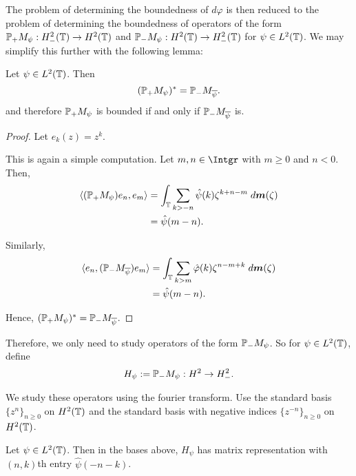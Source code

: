 \documentclass{unswmaths}
\begin{document}
The problem of determining the boundedness of $d\varphi$ is then reduced to the problem of determining
the boundedness of operators of the form $\mathbb{P}_+M_\psi:H^2_-(\mathbb{T})\rightarrow H^2(\mathbb{T})$ and $\mathbb{P}_-M_\psi:H^2(\mathbb{T})\rightarrow H^2_-(\mathbb{T})$ for $\psi \in L^2(\mathbb{T})$. We may simplify
this further with the following lemma:
\begin{lemma}
    Let $\psi \in L^2(\mathbb{T})$. Then
    \begin{equation*}
        (\mathbb{P}_+M_\psi)^* = \mathbb{P}_-M_{\overline{\psi}}.
    \end{equation*}
    and therefore $\mathbb{P}_+M_\psi$ is bounded if and only if $\mathbb{P}_-M_{\overline{\psi}}$ is.
\end{lemma}
\begin{proof}
    Let $e_k(z) = z^k$. 

    This is again a simple computation. Let $m,n\in \Intgr$ with $m \geq 0$ and $n < 0$. Then,
    \begin{align*}
        \langle (\mathbb{P}_+M_\psi)e_n,e_m\rangle &= \int_{\mathbb{T}}\sum_{k>-n} \hat{\psi}(k)\zeta^{k+n-m}\;d\boldsymbol{m}(\zeta)\\
        &= \hat{\psi}(m-n).
    \end{align*}
    
    Similarly,
    \begin{align*}
        \langle e_n, (\mathbb{P}_-M_{\overline{\psi}})e_m \rangle &= \int_{\mathbb{T}} \sum_{k > m} \hat{\varphi}(k) \zeta^{n-m+k}\;d\boldsymbol{m}(\zeta)\\
                                                &= \hat{\psi}(m-n).
    \end{align*}
    
    Hence, $(\mathbb{P}_+M_\psi)^* = \mathbb{P}_-M_{\overline{\psi}}$.

\end{proof}

Therefore, we only need to study operators of the form $\mathbb{P}_-M_\psi$. So for $\psi \in L^2(\mathbb{T})$, define
\begin{equation*}
    H_\psi := \mathbb{P}_-M_\psi:H^2\rightarrow H^2_-.
\end{equation*}

We study these operators using the fourier transform. Use the standard basis $\{z^n\}_{n\geq 0}$
on $H^2(\mathbb{T})$ and the standard basis with negative indices $\{z^{-n}\}_{n \geq 0}$ on $H^2(\mathbb{T})$.

\begin{lemma}
    Let $\psi \in L^2(\mathbb{T})$. Then in the bases above, $H_\psi$ has matrix representation
    with $(n,k)$th entry $\hat{\psi}(-n-k)$. 
\end{lemma}
\end{document}

